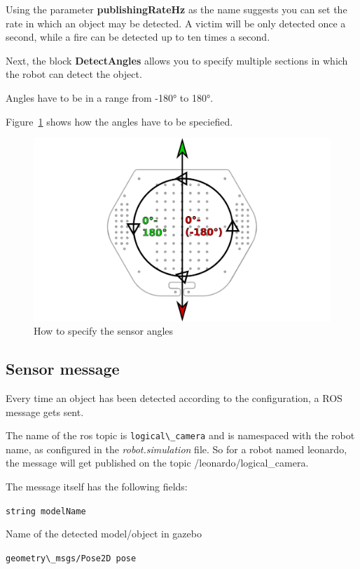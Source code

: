 Using the parameter \textbf{publishingRateHz} as the name suggests you can set the rate in which an object may be detected. A victim will be only detected once a second, while a fire can be detected up to ten times a second.

Next, the block \textbf{DetectAngles} allows you to specify multiple sections in which the robot can detect the object.

Angles have to be in a range from -180° to 180°.

Figure~\ref{fig:TurtleBotSensorAngles} shows how the angles have to be speciefied.

\begin{figure}[htbp]
  \includegraphics[width=1.0\textwidth]{ttbangles.pdf}
  \caption{How to specify the sensor angles}
  \label{fig:TurtleBotSensorAngles}
\end{figure}

\subsection{Sensor message}

Every time an object has been detected according to the configuration, a ROS message gets sent.

The name of the ros topic is \verb$logical\_camera$ and is namespaced with the robot name, as configured in the \textit{robot.simulation} file. So for a robot named leonardo, the message will get published on the topic  /leonardo/logical\_camera.

The message itself has the following fields:

\verb$string modelName$

Name of the detected model/object in gazebo

\verb$geometry\_msgs/Pose2D pose$

